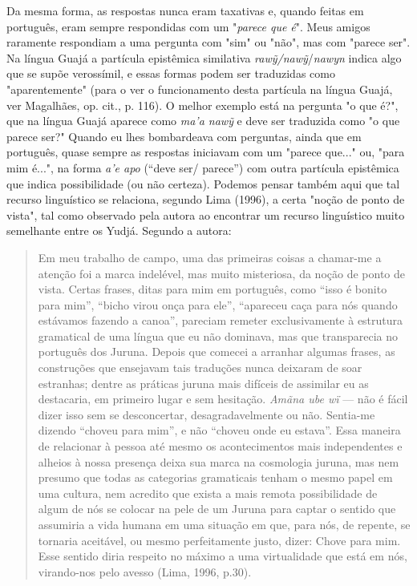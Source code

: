 Da mesma forma, as respostas nunca eram taxativas e, quando feitas em
português, eram sempre respondidas com um "\emph{parece que é}". Meus
amigos raramente respondiam a uma pergunta com "sim" ou "não", mas com
"parece ser". Na língua Guajá a partícula epistêmica similativa
\emph{rawỹ/nawỹ}/\emph{nawyn} indica algo que se supõe verossímil, e
essas formas podem ser traduzidas como "aparentemente" (para o ver o
funcionamento desta partícula na língua Guajá, ver Magalhães, op. cit.,
p. 116). O melhor exemplo está na pergunta "o que é?", que na língua
Guajá aparece como \emph{ma'a nawỹ} e deve ser traduzida como "o que
parece ser?" Quando eu lhes bombardeava com perguntas, ainda que em
português, quase sempre as respostas iniciavam com um "parece que..."
ou, "para mim é...", na forma \emph{a'e apo} (``deve ser/ parece'') com
outra partícula epistêmica que indica possibilidade (ou não certeza).
Podemos pensar também aqui que tal recurso linguístico se relaciona,
segundo Lima (1996), a certa "noção de ponto de vista", tal como
observado pela autora ao encontrar um recurso linguístico muito
semelhante entre os Yudjá. Segundo a autora:

\begin{quote}
Em meu trabalho de campo, uma das primeiras coisas a chamar-me a atenção
foi a marca indelével, mas muito misteriosa, da noção de ponto de vista.
Certas frases, ditas para mim em português, como ``isso é bonito para
mim'', ``bicho virou onça para ele'', ``apareceu caça para nós quando
estávamos fazendo a canoa'', pareciam remeter exclusivamente à estrutura
gramatical de uma língua que eu não dominava, mas que transparecia no
português dos Juruna. Depois que comecei a arranhar algumas frases, as
construções que ensejavam tais traduções nunca deixaram de soar
estranhas; dentre as práticas juruna mais difíceis de assimilar eu as
destacaria, em primeiro lugar e sem hesitação. \emph{Amãna ube wï} ---
não é fácil dizer isso sem se desconcertar, desagradavelmente ou não.
Sentia-me dizendo ``choveu para mim'', e não ``choveu onde eu estava''.
Essa maneira de relacionar à pessoa até mesmo os acontecimentos mais
independentes e alheios à nossa presença deixa sua marca na cosmologia
juruna, mas nem presumo que todas as categorias gramaticais tenham o
mesmo papel em uma cultura, nem acredito que exista a mais remota
possibilidade de algum de nós se colocar na pele de um Juruna para
captar o sentido que assumiria a vida humana em uma situação em que,
para nós, de repente, se tornaria aceitável, ou mesmo perfeitamente
justo, dizer: Chove para mim. Esse sentido diria respeito no máximo a
uma virtualidade que está em nós, virando-nos pelo avesso (Lima, 1996,
p.30).
\end{quote}

